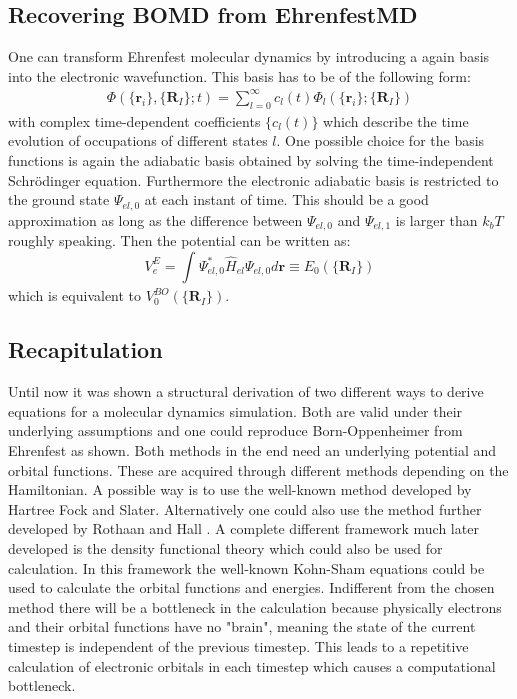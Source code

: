 \documentclass[12pt]{scrartcl}
\begin{document}
\subsection{Recovering BOMD from EhrenfestMD}
One can transform Ehrenfest molecular dynamics by introducing a again basis into the electronic wavefunction. This basis has to be of the following form:
\begin{align*}
\Phi(\{ \mathbf{r}_i\},\{ \mathbf{R}_I\};t ) = \sum_{l=0}^{\infty} c_l(t)\Phi_l(\{ \mathbf{r}_i\};\{ \mathbf{R}_I\})
\end{align*}
with complex time-dependent coefficients $\{ c_l(t)\}$ which describe the time evolution of occupations of different states $l$. One possible choice for the basis functions is again the adiabatic basis obtained by solving the time-independent Schr\"odinger equation. Furthermore the electronic adiabatic basis is restricted to the ground state $\Psi_{el,0}$ at each instant of time. This should be a good approximation as long as the difference between $\Psi_{el,0}$ and $\Psi_{el,1}$ is larger than $k_bT$ roughly speaking. Then the potential can be written as:
\begin{equation}
V_e^{E} = \int_{}^{} \Psi_{el,0}^*\hat{H}_{el}\Psi_{el,0}d \mathbf{r} \equiv E_0(\{\mathbf{R}_I\})
\end{equation}
which is equivalent to $V_0^{BO}(\{\mathbf{R}_I\})$.

\subsection{Recapitulation}
Until now it was shown a structural derivation of two different ways to derive equations for a molecular dynamics simulation. Both are valid under their underlying assumptions and one could reproduce Born-Oppenheimer from Ehrenfest as shown. Both methods in the end need an underlying potential and orbital functions. These are acquired through different methods depending on the Hamiltonian. A possible way is to use the well-known method developed by Hartree Fock and Slater. Alternatively one could also use the method further developed by Rothaan and Hall \cite{roothaan1951new}. A complete different framework much later developed is the density functional theory which could also be used for calculation. In this framework the well-known Kohn-Sham equations \cite{kohn1965self} could be used to calculate the orbital functions and energies. Indifferent from the chosen method there will be a bottleneck in the calculation because physically electrons and their orbital functions have no "brain", meaning the state of the current timestep is independent of the previous timestep. This leads to a repetitive calculation of electronic orbitals in each timestep which causes a computational bottleneck.
\end{document}
